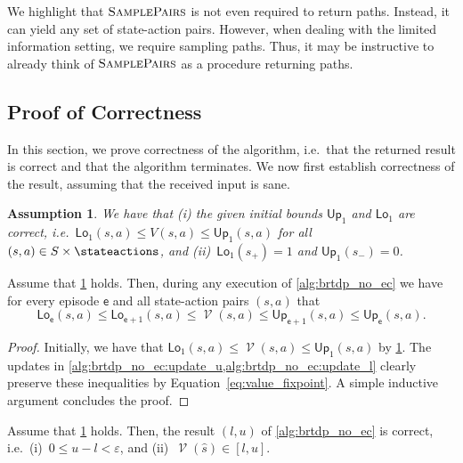 \documentclass{article}
\newcommand{\States}{S}
\newcommand{\initialstate}{\hat{s}}
\DeclareMathOperator{\val}{\mathcal{V}}
\newcommand{\upperbound}{\mathsf{Up}}
\newcommand{\lowerbound}{\mathsf{Lo}}
\newcommand{\targetstate}{s_+}
\newcommand{\sinkstate}{s_-}
\newcommand{\samplepath}{\textsc{SamplePairs}}
\newcommand{\algoepisode}{\mathsf{e}}
\newtheorem{assumption}{Assumption}
\begin{document}
\begin{remark} \label{rem:brtdp_no_ec:sample_pair}
	We highlight that $\samplepath$ is not even required to return paths.
	Instead, it can yield any set of state-action pairs.
	However, when dealing with the limited information setting, we require sampling paths.
	Thus, it may be instructive to already think of $\samplepath$ as a procedure returning paths.
\end{remark}

\subsection{Proof of Correctness}

In this section, we prove correctness of the algorithm, i.e.\ that the returned result is correct and that the algorithm terminates.
We now first establish correctness of the result, assuming that the received input is sane.
\begin{assumption} \label{asm:brtdp_no_ec:input_correct}
	We have that (i) the given initial bounds $\upperbound_1$ and $\lowerbound_1$ are correct, i.e.\ $\lowerbound_1(s, a) \leq V(s, a) \leq \upperbound_1(s, a)$ for all $(s, a) \in \States \times \stateactions$, and (ii)~$\lowerbound_1(\targetstate) = 1$ and $\upperbound_1(\sinkstate) = 0$.
\end{assumption}
\begin{lemma} \label{stm:brtdp:no_ec:bounds_correct}
	Assume that \cref{asm:brtdp_no_ec:input_correct} holds.
	Then, during any execution of \cref{alg:brtdp_no_ec} we have for every episode $\algoepisode$ and all state-action pairs $(s, a)$ that
	\begin{equation*}
		\lowerbound_\algoepisode(s, a) \leq \lowerbound_{\algoepisode + 1}(s, a) \leq \val(s, a) \leq \upperbound_{\algoepisode + 1}(s, a) \leq \upperbound_\algoepisode(s, a).
	\end{equation*}
\end{lemma}
\begin{proof}
	Initially, we have that $\lowerbound_1(s, a) \leq \val(s, a) \leq \upperbound_1(s, a)$ by \cref{asm:brtdp_no_ec:input_correct}.
	The updates in \cref{alg:brtdp_no_ec:update_u,alg:brtdp_no_ec:update_l} clearly preserve these inequalities by Equation~\eqref{eq:value_fixpoint}.
	A simple inductive argument concludes the proof. 
\end{proof}

\begin{lemma} \label{stm:brtdp:no_ec:correct}
	Assume that \cref{asm:brtdp_no_ec:input_correct} holds.
	Then, the result $(l, u)$ of \cref{alg:brtdp_no_ec} is correct, i.e.\ (i)~$0 \leq u - l < \varepsilon$, and (ii)~$\val(\initialstate) \in [l, u]$.
\end{lemma}
\end{document}
